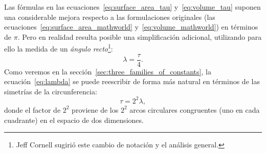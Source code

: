 Las fórmulas en las ecuaciones~\eqref{eq:surface_area_tau} y~\eqref{eq:volume_tau} suponen una considerable mejora respecto a las formulaciones originales (las ecuaciones~\eqref{eq:surface_area_mathworld} y~\eqref{eq:volume_mathworld}) en términos de $\pi$. Pero en realidad resulta posible una simplificación adicional, utilizando para ello la medida de un \emph{ángulo recto}\footnote{Jeff Cornell sugirió este cambio de notación y el análisis general.}:
\begin{equation}
\label{eq:lambda}
\lambda = \frac{\tau}{4}.
\end{equation}
Como veremos en la sección~\ref{sec:three_families_of_constants}, la ecuación~\eqref{eq:lambda} se puede reescribir de forma más natural en términos de las simetrías de la circunferencia:
\begin{equation}
\label{eq:tau_lambda}
\tau = 2^2 \lambda,
\end{equation}
donde el factor de $2^2$ proviene de los $2^2$ arcos circulares congruentes (uno en cada cuadrante) en el espacio de dos dimensiones.

